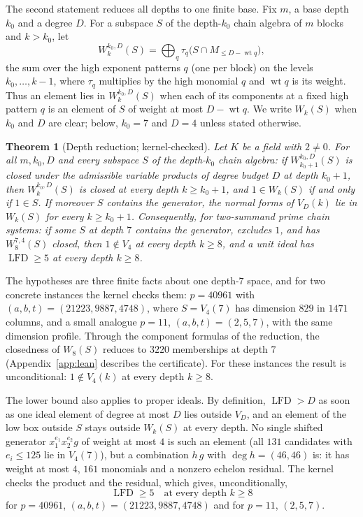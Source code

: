 \documentclass[11pt]{article}
\newtheorem{theorem}{Theorem}
\theoremstyle{definition}\newtheorem{definition}[theorem]{Definition}
\theoremstyle{remark}\newtheorem{remark}[theorem]{Remark}
\newcommand{\lfd}{\operatorname{LFD}}
\newcommand{\wt}{\operatorname{wt}}
\begin{document}
The second statement reduces all depths to one finite base. Fix $m$, a base
depth $k_0$ and a degree $D$. For a subspace $S$ of the depth-$k_0$ chain
algebra of $m$ blocks and $k>k_0$, let
\[
 W^{k_0,D}_k(S)=\bigoplus_q\tau_q\bigl(S\cap M_{\le D-\wt q}\bigr),
\]
the sum over the high exponent patterns $q$ (one per block) on the levels
$k_0,\ldots,k-1$, where $\tau_q$ multiplies by the high monomial $q$ and
$\wt q$ is its weight. Thus an element lies in $W^{k_0,D}_k(S)$ when each
of its components at a fixed high pattern $q$ is an element of $S$ of
weight at most $D-\wt q$. We write $W_k(S)$ when $k_0$ and $D$ are clear;
below, $k_0=7$ and $D=4$ unless stated otherwise.

\begin{theorem}[Depth reduction; kernel-checked]\label{thm:reduction}
Let $K$ be a field with $2\ne0$. For all $m,k_0,D$ and every subspace $S$
of the depth-$k_0$ chain algebra: if $W^{k_0,D}_{k_0+1}(S)$ is closed under the admissible variable products of
degree budget $D$ at depth $k_0+1$, then $W^{k_0,D}_k(S)$ is closed
at every depth $k\ge k_0+1$, and $1\in W_k(S)$ if and only if $1\in S$. If
moreover $S$ contains the generator, the normal forms of $V_D(k)$ lie in
$W_k(S)$ for every $k\ge k_0+1$. Consequently, for two-summand prime chain systems: if some $S$ at depth $7$
contains the generator, excludes $1$, and has $W^{7,4}_8(S)$ closed, then
$1\notin V_4$ at every depth $k\ge8$, and a unit ideal has $\lfd\ge5$ at
every depth $k\ge8$.
\end{theorem}

The hypotheses are three finite facts about one depth-$7$ space, and for two
concrete instances the kernel checks them: $p=40961$ with
$(a,b,t)=(21223,9887,4748)$, where $S=V_4(7)$ has dimension $829$ in $1471$
columns, and a small analogue $p=11$, $(a,b,t)=(2,5,7)$, with the same
dimension profile. Through the component formulas of the reduction, the
closedness of $W_8(S)$ reduces to $3220$ memberships at depth $7$
(Appendix~\ref{app:lean} describes the certificate). For these instances
the result is unconditional: $1\notin V_4(k)$ at every depth $k\ge8$.

The lower bound also applies to proper ideals. By definition, $\lfd>D$ as
soon as one ideal element of degree at most $D$ lies outside $V_D$, and an
element of the low box outside $S$ stays outside $W_k(S)$ at every depth.
No single shifted generator $x_1^{e_1}x_2^{e_2}g$ of weight at most $4$ is
such an element (all $131$ candidates with $e_i\le125$ lie in $V_4(7)$),
but a combination $h\,g$ with $\deg h=(46,46)$ is: it has weight at most
$4$, $161$ monomials and a nonzero echelon residual. The kernel checks the
product and the residual, which gives, unconditionally,
\[
 \lfd\ge5\quad\text{at every depth }k\ge8
\]
for $p=40961$, $(a,b,t)=(21223,9887,4748)$ and for $p=11$, $(2,5,7)$.
\end{document}
